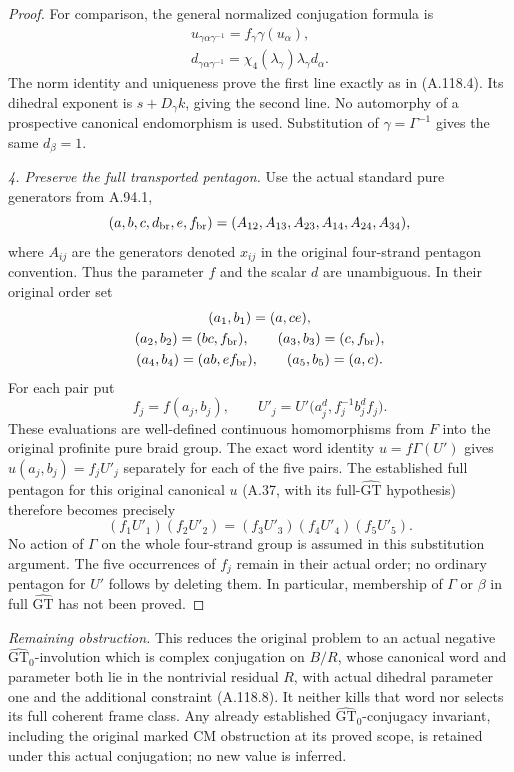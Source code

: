 \begin{proof}
For comparison, the general normalized conjugation formula is
\[
 \begin{gathered}
 u_{\gamma\alpha\gamma^{-1}}=f_\gamma\gamma(u_\alpha),\\
 d_{\gamma\alpha\gamma^{-1}}
 =\chi_4(\lambda_\gamma)\lambda_\gamma d_\alpha.
 \end{gathered}                                                   \tag{A.118.6}
\]
The norm identity and uniqueness prove the first line exactly as
in (A.118.4). Its dihedral exponent is
\(s+D_\gamma k\), giving the second line. No automorphy of a
prospective canonical endomorphism is used. Substitution of
\(\gamma=\Gamma^{-1}\) gives the same \(d_\beta=1\).

\medskip\noindent\emph{4. Preserve the full transported pentagon.}
Use the actual standard pure generators from A.94.1,
\[
 (a,b,c,d_{\rm br},e,f_{\rm br})
   =(A_{12},A_{13},A_{23},A_{14},A_{24},A_{34}),
\]
where \(A_{ij}\) are the generators denoted \(x_{ij}\) in the
original four-strand pentagon convention. Thus the parameter
\(f\) and the scalar \(d\) are unambiguous. In their original order set
\[
 \begin{gathered}
 (a_1,b_1)=(a,ce),\\
 (a_2,b_2)=(bc,f_{\rm br}),\qquad
 (a_3,b_3)=(c,f_{\rm br}),\\
 (a_4,b_4)=(ab,ef_{\rm br}),\qquad
 (a_5,b_5)=(a,c).
 \end{gathered}
\]
For each pair put
\[
 f_j=f(a_j,b_j),\qquad
 U'_j=U'\bigl(a_j^d,f_j^{-1}b_j^df_j\bigr).                 \tag{A.118.7}
\]
These evaluations are well-defined continuous homomorphisms from
\(F\) into the original profinite pure braid group. The exact word
identity \(u=f\Gamma(U')\) gives
\(u(a_j,b_j)=f_jU'_j\) separately for each of the five pairs.
The established full pentagon for this original canonical \(u\)
(A.37, with its full-\(\widehat{\mathrm{GT}}\) hypothesis) therefore
becomes precisely
\[
 \boxed{(f_1U'_1)(f_2U'_2)
       =(f_3U'_3)(f_4U'_4)(f_5U'_5).}                       \tag{A.118.8}
\]
No action of \(\Gamma\) on the whole four-strand group is assumed
in this substitution argument. The five occurrences of \(f_j\)
remain in their actual order; no ordinary pentagon for \(U'\) follows
by deleting them. In particular, membership of \(\Gamma\) or
\(\beta\) in full \(\widehat{\mathrm{GT}}\) has not been proved.
\end{proof}
\noindent\emph{Remaining obstruction.}
This reduces the original problem to an actual negative
\(\widehat{\mathrm{GT}}_0\)-involution which is complex conjugation
on \(B/R\), whose canonical word and parameter both lie in the
nontrivial residual \(R\), with actual dihedral parameter one and
the additional constraint (A.118.8). It neither kills that word nor
selects its full coherent frame class. Any already established
\(\widehat{\mathrm{GT}}_0\)-conjugacy invariant, including the original
marked CM obstruction at its proved scope, is retained under this
actual conjugation; no new value is inferred.
